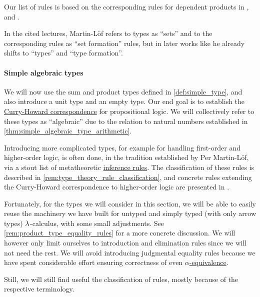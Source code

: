 \begin{comments}
  \item Our list of rules is based on the corresponding rules for dependent products in , \cite[\S A.2.4]{UnivalentFoundationsProgram2013HoTT} and \cite[\S 8.1.10]{Mimram2020ProgramEqualsProof}.

  \item In the cited lectures, Martin-L\"of refers to types as \enquote{sets} and to the corresponding rules as \enquote{set formation} rules, but in later works like \cite{MartinLöf1994TypeJudgments} he already shifts to \enquote{types} and \enquote{type formation}.
\end{comments}

\paragraph{Simple algebraic types}

\begin{remark}\label{rem:extended_simple_type_theory}
  We will now use the sum and product types defined in \cref{def:simple_type}, and also introduce a unit type and an empty type. Our end goal is to establish the \hyperref[con:curry_howard_correspondence]{Curry-Howard correspondence} for propositional logic. We will collectively refer to these types as \enquote{algebraic} due to the relation to natural numbers established in \cref{thm:simple_algebraic_type_arithmetic}.

  Introducing more complicated types, for example for handling first-order and higher-order logic, is often done, in the tradition established by Per Martin-L\"of, via a stout list of metatheoretic \hyperref[def:inference_rule]{inference rules}. The classification of these rules is described in \cref{rem:type_theory_rule_classification}, and concrete rules extending the Curry-Howard correspondence to higher-order logic are presented in .

  Fortunately, for the types we will consider in this section, we will be able to easily reuse the machinery we have built for untyped and simply typed (with only arrow types) \( {\mathrm \lambda} \)-calculus, with some small adjustments. See \cref{rem:product_type_equality_rules} for a more concrete discussion. We will however only limit ourselves to introduction and elimination rules since we will not need the rest. We will avoid introducing judgmental equality rules because we have spent considerable effort ensuring correctness of even \hyperref[def:lambda_term_alpha_equivalence]{\( \alpha \)-equivalence}.

  Still, we will still find useful the classification of rules, mostly because of the respective terminology.
\end{remark}

